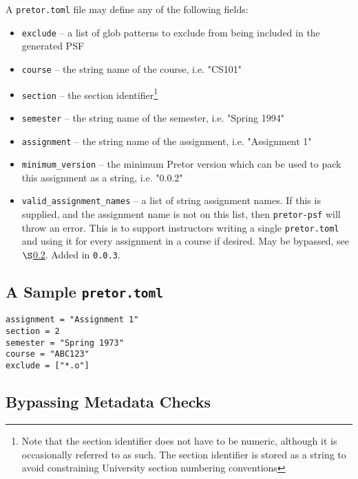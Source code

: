 \documentclass{book}
\begin{document}
A \texttt{pretor.toml} file may define any of the following fields:

\begin{itemize}

	\item \texttt{exclude} -- a list of glob patterns to exclude from being
		included in the generated PSF

	\item \texttt{course} -- the string name of the course, i.e. "CS101"

	\item \texttt{section} -- the section identifier\footnote{Note that the
		section identifier does not have to be numeric, although
		it is occasionally referred to as such. The section identifier
		is stored as a string to avoid constraining University section
		numbering conventions}

	\item \texttt{semester} -- the string name of the semester, i.e.
		"Spring 1994"

	\item \texttt{assignment} -- the string name of the assignment, i.e.
		"Assignment 1"

	\item \texttt{minimum\_version} -- the minimum Pretor version which
		can be used to pack this assignment as a string, i.e. "0.0.2"

	\item \texttt{valid\_assignment\_names} -- a list of string assignment
		names. If this is supplied, and the assignment name is not on
		this list, then \texttt{pretor-psf} will throw an error. This
		is to support instructors writing a single \texttt{pretor.toml}
		and using it for every assignment in a course if desired.  May
		be bypassed, see $\S$\ref{sec:bypass}. Added in \texttt{0.0.3}.

\end{itemize}

\subsection{A Sample \texttt{pretor.toml}}

\begin{verbatim}
assignment = "Assignment 1"
section = 2
semester = "Spring 1973"
course = "ABC123"
exclude = ["*.o"]
\end{verbatim}

\subsection{Bypassing Metadata Checks} \label{sec:bypass}
\end{document}
